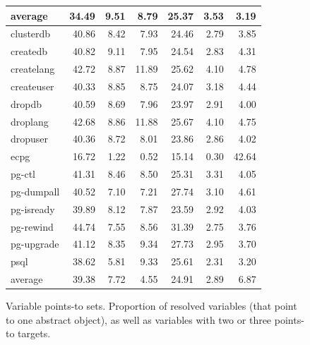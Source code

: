 \begin{figure}[htb!]
\begin{tabular}{l r@{\quad}rr r@{\quad}rr}
    \midrule
    average  & 34.49 &  9.51 & 8.79 & 25.37 & 3.53 & 3.19 \\
    \midrule
    clusterdb  & 40.86 & 8.42 &  7.93 & 24.46 & 2.79 &  3.85 \\
    createdb   & 40.82 & 9.11 &  7.95 & 24.54 & 2.83 &  4.31 \\
    createlang & 42.72 & 8.87 & 11.89 & 25.62 & 4.10 &  4.78 \\
    createuser & 40.33 & 8.85 &  8.75 & 24.07 & 3.18 &  4.44 \\
    dropdb     & 40.59 & 8.69 &  7.96 & 23.97 & 2.91 &  4.00 \\
    droplang   & 42.68 & 8.86 & 11.88 & 25.67 & 4.10 &  4.75 \\
    dropuser   & 40.36 & 8.72 &  8.01 & 23.86 & 2.86 &  4.02 \\
    ecpg       & 16.72 & 1.22 &  0.52 & 15.14 & 0.30 & 42.64 \\
    pg-ctl     & 41.31 & 8.46 &  8.50 & 25.31 & 3.31 &  4.05 \\
    pg-dumpall & 40.52 & 7.10 &  7.21 & 27.74 & 3.10 &  4.61 \\
    pg-isready & 39.89 & 8.12 &  7.87 & 23.59 & 2.92 &  4.03 \\
    pg-rewind  & 44.74 & 7.55 &  8.56 & 31.39 & 2.75 &  3.76 \\
    pg-upgrade & 41.12 & 8.35 &  9.34 & 27.73 & 2.95 &  3.70 \\
    psql       & 38.62 & 5.81 &  9.33 & 25.61 & 2.31 &  3.20 \\
    \midrule
    average    & 39.38 & 7.72 &  4.55 & 24.91 & 2.89 &  6.87 \\
    \bottomrule
  \end{tabular}
  \caption[Variable points-to sets]{%
    Variable points-to sets. Proportion of resolved variables (that
    point to one abstract object), as well as variables with two or
    three points-to targets.}
  \label{structsens/fig/stats:var}
\end{figure}

